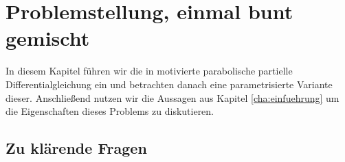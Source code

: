 
\chapter{Problemstellung, einmal bunt gemischt}

In diesem Kapitel führen wir die in \cite{Stasiak:2011ba} motivierte parabolische partielle Differentialgleichung ein und betrachten danach eine parametrisierte Variante dieser.
Anschließend nutzen wir die Aussagen aus Kapitel \ref{cha:einfuehrung} um die Eigenschaften dieses Problems zu diskutieren.

\section*{Zu klärende Fragen} %
\label{sub:zu_kl_rende_fragen}

